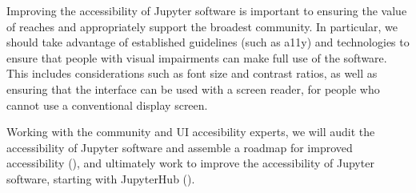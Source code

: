 \begin{task}[
  title=Accessibility in Jupyter,
  id=accessibility,
  lead=SRL,
  PM=12,
  wphases={12-36},
  partners={}
]

  Improving the accessibility of Jupyter software
  is important to ensuring the value of \TheProject reaches and appropriately support 
  the broadest community.
  In particular, we should take advantage of established guidelines (such as a11y) and
  technologies to ensure that people with visual impairments can make full use
  of the software.
  This includes considerations such as font size and contrast ratios,
  as well as ensuring that the interface can be used with a screen reader,
  for people who cannot use a conventional display screen.

  Working with the community and UI accesibility experts, we will audit the accessibility 
  of Jupyter software and assemble a roadmap for improved accessibility
  (),
  and ultimately work to improve the accessibility of Jupyter software,
  starting with JupyterHub ().
\end{task}
